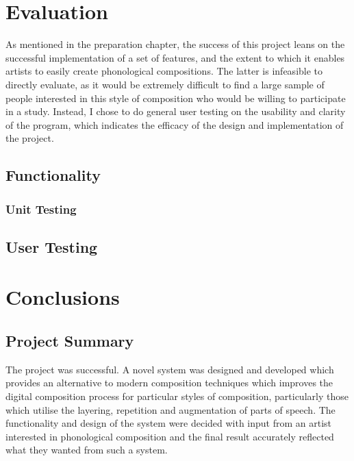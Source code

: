 \documentclass[12pt,a4paper,twoside,openright]{report}
\begin{document}
\chapter{Evaluation}
As mentioned in the preparation chapter, the success of this project leans on the successful implementation of a set of features, and the extent to which it enables artists to easily create phonological compositions. The latter is infeasible to directly evaluate, as it would be extremely difficult to find a large sample of people interested in this style of composition who would be willing to participate in a study. Instead, I chose to do general user testing on the usability and clarity of the program, which indicates the efficacy of the design and implementation of the project.

\section{Functionality}

\subsection{Unit Testing}

\section{User Testing}

\subsection{}


\chapter{Conclusions}
\section{Project Summary}
The project was successful. A novel system was designed and developed which provides an alternative to modern composition techniques which improves the digital composition process for particular styles of composition, particularly those which utilise the layering, repetition and augmentation of parts of speech. The functionality and design of the system were decided with input from an artist interested in phonological composition and the final result accurately reflected what they wanted from such a system.
\end{document}
